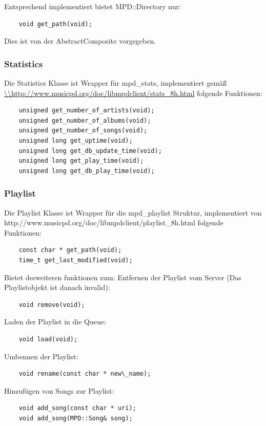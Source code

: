 Entsprechend implementiert bietet MPD::Directory nur:
\begin{verbatim}
    void get_path(void);
\end{verbatim}

Dies ist von der AbstractComposite vorgegeben.

\newpage
\subsubsection{Statistics}
Die Statistics Klasse ist Wrapper für mpd\_stats, implementiert gemäß \url{\\http://www.musicpd.org/doc/libmpdclient/stats\_8h.html}
folgende Funktionen:
\begin{verbatim}
    unsigned get_number_of_artists(void);
    unsigned get_number_of_albums(void);
    unsigned get_number_of_songs(void);
    unsigned long get_uptime(void);
    unsigned long get_db_update_time(void);
    unsigned long get_play_time(void);
    unsigned long get_db_play_time(void);
\end{verbatim}


\subsubsection{Playlist}
Die Playlist Klasse ist Wrapper für die mpd\_playlist Struktur, implementiert von http://www.musicpd.org/doc/libmpdclient/playlist\_8h.html folgende Funktionen:
\begin{verbatim}
    const char * get_path(void);
    time_t get_last_modified(void);
\end{verbatim}

Bietet desweiteren funktionen zum:
Entfernen der Playlist vom Server (Das Playlistobjekt ist danach invalid):
\begin{verbatim}
    void remove(void);
\end{verbatim}

Laden der Playlist in die Queue:
\begin{verbatim}
    void load(void);
\end{verbatim}

Umbennen der Playlist:
\begin{verbatim}
    void rename(const char * new\_name);
\end{verbatim}

Hinzufügen von Songs zur Playlist:
\begin{verbatim}
    void add_song(const char * uri);
    void add_song(MPD::Song& song);
\end{verbatim}

